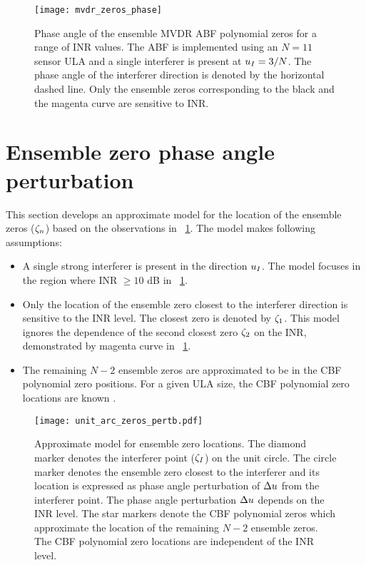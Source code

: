 
\begin{figure}[!hp]
  \centering
  \texttt{[image: mvdr\_zeros\_phase]}
  \caption{Phase angle of the ensemble MVDR ABF polynomial zeros for a
    range of INR values. The ABF is implemented using an $N = 11$
    sensor ULA and a single interferer is present at $u_I =
    3/N$.
    The phase angle of the interferer direction is denoted by the
    horizontal dashed line. Only the ensemble zeros corresponding to
    the black and the magenta curve are sensitive to INR.}
  \label{fig:mvdr-zeros-phase}
\end{figure}

\section{Ensemble zero phase angle perturbation}
\label{sec:perturbation-model}
This section develops an approximate model for the location of the
ensemble zeros ($\zeta_n$) based on the observations in
\figurename{}~\ref{fig:mvdr-zeros-phase}. The model makes following
assumptions:
\begin{itemize}
\item A single strong interferer is present in the direction
  $u_I$. The model focuses in the region where INR $\geq 10$ dB in \figurename{}~\ref{fig:mvdr-zeros-phase}.
\item Only the location of the ensemble zero closest to the interferer
  direction is sensitive to the INR level. The closest zero is denoted
  by $\zeta_1$. This model ignores the dependence of the second
  closest zero $\zeta_2$ on the INR, demonstrated by magenta curve in
  \figurename{}~\ref{fig:mvdr-zeros-phase}.
\item The remaining $N - 2$ ensemble zeros are approximated to be in
  the CBF polynomial zero positions. For a given ULA size, the CBF
  polynomial zero locations are known \cite{vtree2002oap}.
\end{itemize}

\begin{figure}[!hp]
  \centering
  \texttt{[image: unit\_arc\_zeros\_pertb.pdf]}
  \caption[Approximate ensemble zero model.]{Approximate model for
    ensemble zero locations. The diamond marker denotes the interferer
    point ($\zeta_I$) on the unit circle. The circle marker denotes
    the ensemble zero closest to the interferer and its location is
    expressed as phase angle perturbation of $\Delta u$ from the
    interferer point. The phase angle perturbation $\Delta u$ depends
    on the INR level. The star markers denote the CBF polynomial zeros
    which approximate the location of the remaining $N - 2$ ensemble
    zeros. The CBF polynomial zero locations are independent of the
    INR level.}
  \label{fig:perturb-model}
\end{figure}


